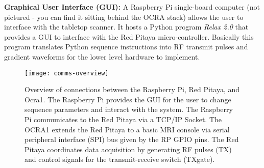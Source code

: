 \vspace{5mm} 

\noindent\textbf{Graphical User Interface (GUI):} A Raspberry Pi single-board computer (not pictured - you can find it sitting behind the OCRA stack) allows the user to interface with the tabletop scanner. It hosts a Python program \emph{Relax 2.0} that provides a GUI to interface with the Red Pitaya micro-controller. Basically this program translates Python sequence instructions into RF transmit pulses and gradient waveforms for the lower level hardware to implement.

\begin{figure}[h]
    \centering
    \texttt{[image: comms-overview]}
    \captionsetup{width=.9\textwidth}
    \caption{\label{fig:comms-overview} Overview of connections between the Raspberry Pi, Red Pitaya, and Ocra1. The Raspberry Pi provides the GUI for the user to change sequence parameters and interact with the system. The Raspberry Pi communicates to the Red Pitaya via a TCP/IP Socket. The OCRA1 extends the Red Pitaya to a basic MRI console via serial peripheral interface (SPI) bus given by the RP GPIO pins. The Red Pitaya coordinates data acquisition by generating RF pulses (TX) and control signals for the transmit-receive switch (TXgate).}
    \vspace{-5mm}
\end{figure}